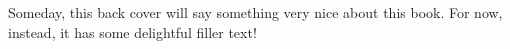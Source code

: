 \coverbacktextfont
Someday, this back cover will say something very nice about this book.
For now, instead, it has some delightful filler text!

